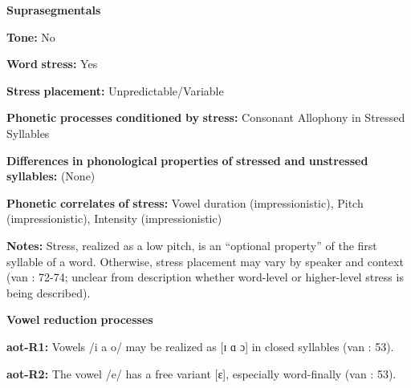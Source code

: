 \begin{styleBody}
\textbf{Suprasegmentals}
\end{styleBody}

\begin{styleBody}
\textbf{Tone:} No
\end{styleBody}

\begin{styleBody}
\textbf{Word} \textbf{stress:} Yes
\end{styleBody}

\begin{styleBody}
\textbf{Stress} \textbf{placement:} Unpredictable/Variable
\end{styleBody}

\begin{styleBody}
\textbf{Phonetic} \textbf{processes} \textbf{conditioned} \textbf{by} \textbf{stress:} Consonant Allophony in Stressed Syllables
\end{styleBody}

\begin{styleBody}
\textbf{Differences} \textbf{in} \textbf{phonological} \textbf{properties} \textbf{of} \textbf{stressed} \textbf{and} \textbf{unstressed} \textbf{syllables:} (None)
\end{styleBody}

\begin{styleBody}
\textbf{Phonetic} \textbf{correlates} \textbf{of} \textbf{stress:} Vowel duration (impressionistic), Pitch (impressionistic), Intensity (impressionistic)
\end{styleBody}

\begin{styleBody}
\textbf{Notes:} Stress, realized as a low pitch, is an “optional property” of the first syllable of a word. Otherwise, stress placement may vary by speaker and context (van \citealt{Breugel2008}: 72-74; unclear from description whether word-level or higher-level stress is being described).
\end{styleBody}

\begin{styleBody}
\textbf{Vowel} \textbf{reduction} \textbf{processes}
\end{styleBody}

\begin{styleBody}
\textbf{aot-R1:} Vowels /i a o/ may be realized as [ɪ ɑ ɔ] in closed syllables (van \citealt{Breugel2008}: 53).
\end{styleBody}

\begin{styleBody}
\textbf{aot-R2:} The vowel /e/ has a free variant [ɛ], especially word-finally (van \citealt{Breugel2008}: 53).
\end{styleBody}

